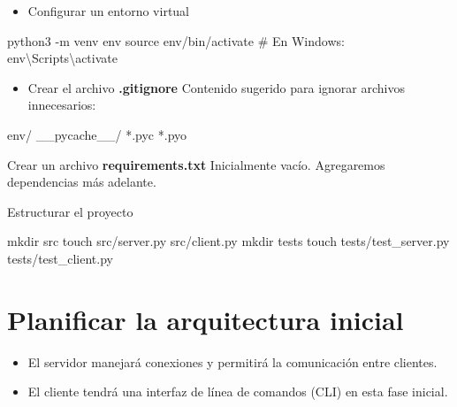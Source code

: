\documentclass[
  a4paper,
  DIV=11,
  numbers=noendperiod,
  onepage,
  openany]{scrreprt}
\newenvironment{Shaded}{\begin{snugshade}}{\end{snugshade}}
\newcommand{\AttributeTok}[1]{\textcolor[rgb]{0.40,0.45,0.13}{#1}}
\newcommand{\BuiltInTok}[1]{\textcolor[rgb]{0.00,0.23,0.31}{#1}}
\newcommand{\CommentTok}[1]{\textcolor[rgb]{0.37,0.37,0.37}{#1}}
\newcommand{\ExtensionTok}[1]{\textcolor[rgb]{0.00,0.23,0.31}{#1}}
\newcommand{\FunctionTok}[1]{\textcolor[rgb]{0.28,0.35,0.67}{#1}}
\newcommand{\NormalTok}[1]{\textcolor[rgb]{0.00,0.23,0.31}{#1}}
\providecommand{\tightlist}{%
  \setlength{\itemsep}{0pt}\setlength{\parskip}{0pt}}\usepackage{longtable,booktabs,array}
\begin{document}
\begin{itemize}
\tightlist
\item
  Configurar un entorno virtual
\end{itemize}

\begin{Shaded}
\begin{Highlighting}[]
\ExtensionTok{python3} \AttributeTok{{-}m}\NormalTok{ venv env}
\BuiltInTok{source}\NormalTok{ env/bin/activate  }\CommentTok{\# En Windows: env\textbackslash{}Scripts\textbackslash{}activate}
\end{Highlighting}
\end{Shaded}

\begin{itemize}
\tightlist
\item
  Crear el archivo \textbf{.gitignore} Contenido sugerido para ignorar
  archivos innecesarios:
\end{itemize}

\begin{Shaded}
\begin{Highlighting}[]
\NormalTok{env/}
\NormalTok{\_\_pycache\_\_/}
\NormalTok{*.pyc}
\NormalTok{*.pyo}
\end{Highlighting}
\end{Shaded}

Crear un archivo \textbf{requirements.txt} Inicialmente vacío.
Agregaremos dependencias más adelante.

Estructurar el proyecto

\begin{Shaded}
\begin{Highlighting}[]
\FunctionTok{mkdir}\NormalTok{ src}
\FunctionTok{touch}\NormalTok{ src/server.py src/client.py}
\FunctionTok{mkdir}\NormalTok{ tests}
\FunctionTok{touch}\NormalTok{ tests/test\_server.py tests/test\_client.py}
\end{Highlighting}
\end{Shaded}

\section{Planificar la arquitectura
inicial}\label{planificar-la-arquitectura-inicial}

\begin{itemize}
\item
  El servidor manejará conexiones y permitirá la comunicación entre
  clientes.
\item
  El cliente tendrá una interfaz de línea de comandos (CLI) en esta fase
  inicial.
\end{itemize}
\end{document}

